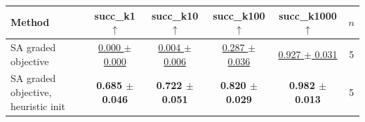 \begin{tabular}{lccccc}
\toprule
Method & succ\_k1 $\uparrow$ & succ\_k10 $\uparrow$ & succ\_k100 $\uparrow$ & succ\_k1000 $\uparrow$ & $n$ \\
\midrule
SA graded objective & \underline{0.000 $\pm$ 0.000} & \underline{0.004 $\pm$ 0.006} & \underline{0.287 $\pm$ 0.036} & \underline{0.927 $\pm$ 0.031} & 5 \\
SA graded objective, heuristic init & \textbf{0.685 $\pm$ 0.046} & \textbf{0.722 $\pm$ 0.051} & \textbf{0.820 $\pm$ 0.029} & \textbf{0.982 $\pm$ 0.013} & 5 \\
\bottomrule
\end{tabular}

